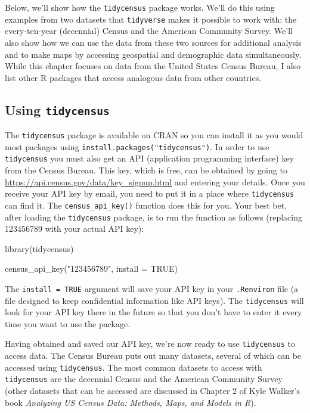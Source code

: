 \documentclass[
]{book}
\newenvironment{Shaded}{\begin{snugshade}}{\end{snugshade}}
\newcommand{\AttributeTok}[1]{\textcolor[rgb]{0.77,0.63,0.00}{#1}}
\newcommand{\ConstantTok}[1]{\textcolor[rgb]{0.00,0.00,0.00}{#1}}
\newcommand{\FunctionTok}[1]{\textcolor[rgb]{0.00,0.00,0.00}{#1}}
\newcommand{\NormalTok}[1]{#1}
\newcommand{\StringTok}[1]{\textcolor[rgb]{0.31,0.60,0.02}{#1}}
\begin{document}
Below, we'll show how the \texttt{tidycensus} package works. We'll do this using examples from two datasets that \texttt{tidyverse} makes it possible to work with: the every-ten-year (decennial) Census and the American Community Survey. We'll also show how we can use the data from these two sources for additional analysis and to make maps by accessing geospatial and demographic data simultaneously. While this chapter focuses on data from the United States Census Bureau, I also list other R packages that access analogous data from other countries.

\hypertarget{using-tidycensus}{%
\subsection*{\texorpdfstring{Using \texttt{tidycensus}}{Using tidycensus}}\label{using-tidycensus}}

The \texttt{tidycensus} package is available on CRAN so you can install it as you would most packages using \texttt{install.packages("tidycensus")}. In order to use \texttt{tidycensus} you must also get an API (application programming interface) key from the Census Bureau. This key, which is free, can be obtained by going to \url{https://api.census.gov/data/key_signup.html} and entering your details. Once you receive your API key by email, you need to put it in a place where \texttt{tidycensus} can find it. The \texttt{census\_api\_key()} function does this for you. Your best bet, after loading the \texttt{tidycensus} package, is to run the function as follows (replacing 123456789 with your actual API key):

\begin{Shaded}
\begin{Highlighting}[]
\FunctionTok{library}\NormalTok{(tidycensus)}

\FunctionTok{census\_api\_key}\NormalTok{(}\StringTok{"123456789"}\NormalTok{, }\AttributeTok{install =} \ConstantTok{TRUE}\NormalTok{)}
\end{Highlighting}
\end{Shaded}

The \texttt{install\ =\ TRUE} argument will save your API key in your \texttt{.Renviron} file (a file designed to keep confidential information like API keys). The \texttt{tidycensus} will look for your API key there in the future so that you don't have to enter it every time you want to use the package.

Having obtained and saved our API key, we're now ready to use \texttt{tidycensus} to access data. The Census Bureau puts out many datasets, several of which can be accessed using \texttt{tidycensus}. The most common datasets to access with \texttt{tidycensus} are the decennial Census and the American Community Survey (other datasets that can be accessed are discussed in Chapter 2 of Kyle Walker's book \emph{Analyzing US Census Data: Methods, Maps, and Models in R}).
\end{document}
